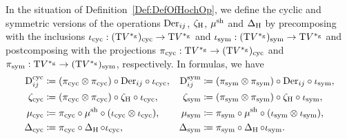\documentclass[\MainFolder/Text.tex]{subfiles}
\begin{document}
\begin{Definition}\label{Def:CycSymVersions}
In the situation of Definition~\ref{Def:DefOfHochOp}, we define the cyclic and symmetric versions of the operations $\Der_{ij}$, $\CoProdHoch$, $\ProdSh$ and $\BVOpHoch$ by precomposing with the inclusions $\CycInc: (\Ten V^{\GD})_{\CycMRM} \rightarrow \Ten V^{\GD}$ and $\SymInc: (\Ten V^{\GD})_{\SymMRM} \rightarrow \Ten V^{\GD}$ and postcomposing with the projections $\CycProj: \Ten V^{\GD} \rightarrow (\Ten V^{\GD})_{\CycMRM}$ and $\SymProj: \Ten V^{\GD} \rightarrow (\Ten V^{\GD})_{\SymMRM}$, respectively. In formulas, we have
\begin{equation}\label{Eq:CycSymVersions}\begin{aligned}
 \DerCyc_{ij} & \coloneqq (\CycProj\otimes\CycProj)\circ\Der_{ij}\circ\CycInc, & \DerSym_{ij} & \coloneqq (\SymProj\otimes\SymProj)\circ\Der_{ij}\circ\SymInc, \\
 \CoProdCyc & \coloneqq (\CycProj\otimes\CycProj)\circ\CoProdHoch\circ\CycInc, &  \CoProdSym & \coloneqq (\SymProj\otimes\SymProj)\circ\CoProdHoch\circ\SymInc, \\ 
 \ProdCyc & \coloneqq \CycProj\circ\ProdSh\circ(\CycInc\otimes\CycInc), & \ProdSym & \coloneqq \SymProj\circ\ProdSh\circ(\SymInc\otimes\SymInc), \\ 
 \BVOpCyc & \coloneqq \CycProj\circ\BVOpHoch\circ\CycInc, & \BVOpSym & \coloneqq \SymProj\circ\BVOpHoch\circ\SymInc.
\end{aligned}\end{equation}
\end{Definition}
\end{document}
